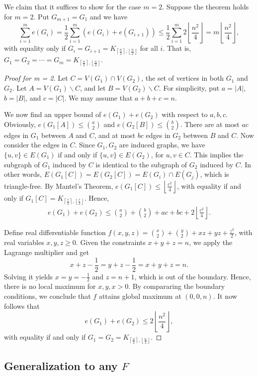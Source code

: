 \documentclass[a4paper]{article}
\begin{document}
We claim that it suffices to show for the case $m = 2$. Suppose the theorem holds for $m = 2$. Put
$G_{m + 1} = G_1$ and we have
\[
  \sum_{i = 1}^m e(G_i) = \frac{1}{2}\sum_{i = 1}^m (e(G_i) + e(G_{i + 1})) \leq \frac{1}{2}\sum_{i = 1}^m 2\left\lfloor\frac{n^2}{4}\right\rfloor = m\left\lfloor\frac{n^2}{4}\right\rfloor,
\]
with equality only if $G_i = G_{i + 1} = K_{\left\lceil\frac{n}{2}\right\rceil,
  \left\lfloor\frac{n}{2}\right\rfloor}$ for all $i$. That is, $G_1 = G_2 = \cdots = G_m =
  K_{\left\lceil\frac{n}{2}\right\rceil, \left\lfloor\frac{n}{2}\right\rfloor}$.

\begin{proof}[Proof for m = 2]
  Let $C = V(G_1) \cap V(G_2)$, the set of vertices in both $G_1$ and $G_2$. Let $A = V(G_1)
  \backslash C$, and let $B = V(G_2) \backslash C$. For simplicity, put $a = |A|$, $b = |B|$, and $c
  = |C|$. We may assume that $a + b + c = n$. 

  We now find an upper bound of $e(G_1) + e(G_2)$ with respect to $a, b, c$. Obviously, $e(G_1[A])
  \leq \binom{a}{2}$ and $e(G_2[B]) \leq \binom{b}{2}$. There are at most $ac$ edges in $G_1$
  between $A$ and $C$, and at most $bc$ edges in $G_2$ between $B$ and $C$. Now consider the edges
  in $C$. Since $G_1, G_2$ are induced graphs, we have $\{u, v\} \in E(G_1)$ if and only if $\{u,
  v\} \in E(G_2)$, for $u, v \in C$. This implies the subgraph of $G_1$ induced by $C$ is identical
  to the subgraph of $G_2$ induced by $C$. In other words, $E(G_1[C]) = E(G_2[C]) = E(G_i) \cap
  E(G_j)$, which is triangle-free. By Mantel's Theorem, $e(G_1[C]) \leq
  \left\lfloor\frac{c^2}{4}\right\rfloor$, with equality if and only if $G_1[C] =
  K_{\left\lceil\frac{c}{2}\right\rceil, \left\lfloor\frac{c}{2}\right\rfloor}$. Hence, 
  \begin{gather}
    e(G_1) + e(G_2) \leq \binom{a}{2} + \binom{b}{2} + ac + bc + 2\left\lfloor\frac{c^2}{4}\right\rfloor.
  \end{gather}

  Define real differentiable function $f(x, y, z) = \binom{x}{2} + \binom{y}{2} + xz + yz +
  \frac{z^2}{2}$, with real variables $x, y, z \geq 0$. Given the constraints $x + y + z = n$, we
  apply the Lagrange multiplier and get
  \[
    x + z - \frac{1}{2} = y + z - \frac{1}{2} = x + y + z = n.
  \]
  Solving it yields $x = y = -\frac{1}{2}$ and $z = n + 1$, which is out of the boundary. Hence,
  there is no local maximum for $x, y, x > 0$. By compararing the boundary conditions, we conclude
  that $f$ attains global maximum at $(0, 0, n)$. It now follows that 
  \[
    e(G_1) + e(G_2) \leq 2\left\lfloor\frac{n^2}{4}\right\rfloor,
  \]
  with equality if and only if $G_1 = G_2 = K_{\left\lceil\frac{n}{2}\right\rceil, \left\lfloor\frac{n}{2}\right\rfloor}$.
\end{proof}

\subsection{Generalization to any $F$}
\end{document}
